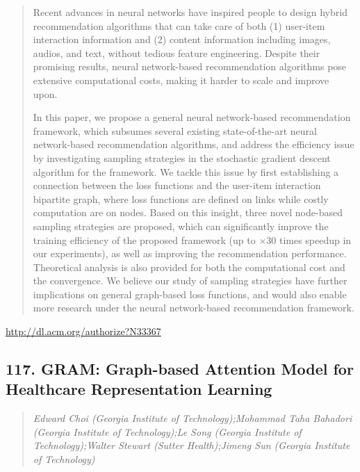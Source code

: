 \documentclass{article}
\begin{document}
\begin{quote}
Recent advances in neural networks have inspired people to design hybrid recommendation algorithms that can take care of both (1) user-item interaction information and (2) content information including images, audios, and text, without tedious feature engineering. Despite their promising results, neural network-based recommendation algorithms pose extensive computational costs, making it harder to scale and improve upon. 







  In this paper, we propose a general neural network-based recommendation framework, which subsumes several existing state-of-the-art neural network-based recommendation algorithms, and address the efficiency issue by investigating sampling strategies in the stochastic gradient descent algorithm for the framework. We tackle this issue by first establishing a connection between the loss functions and the user-item interaction bipartite graph, where loss functions are defined on links while costly computation are on nodes. Based on this insight, three novel node-based sampling strategies are proposed, which can significantly improve the training efficiency of the proposed framework (up to $\times 30$ times speedup in our experiments), as well as improving the recommendation performance. Theoretical analysis is also provided for both the computational cost and the convergence. We believe our study of sampling strategies have further implications on general graph-based loss functions, and would also enable more research under the neural network-based recommendation framework.
\end{quote}

\href{http://dl.acm.org/authorize?N33367}{http://dl.acm.org/authorize?N33367}

\subsection{117. GRAM: Graph-based Attention Model for Healthcare Representation Learning}

\begin{quote}
\footnotesize{\textit{Edward Choi (Georgia Institute of Technology);Mohammad Taha Bahadori (Georgia Institute of Technology);Le Song (Georgia Institute of Technology);Walter Stewart (Sutter Health);Jimeng Sun (Georgia Institute of Technology)}}

\end{quote}
\end{document}
